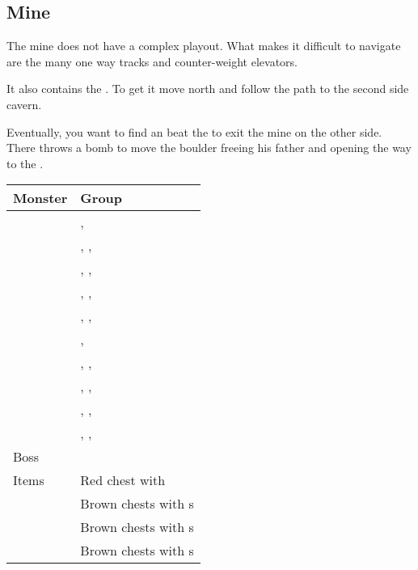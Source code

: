 \subsection{Mine}
\label{map:mine}

The mine does not have a complex playout. What makes it difficult to navigate are the many one way tracks and counter-weight elevators.

It also contains the . To get it move north and follow the path to the second side cavern.

Eventually, you want to find an beat the  to exit the mine on the other side. There  throws a bomb to move the boulder freeing his father and opening the way to the .


\noindent\begin{tabularx}{\textwidth}[l]{lX}
	Monster & Group
\\ \hline
	\nameref{monster:red_bone}
	& \nameref{monster:red_bone}, \nameref{monster:red_bone} \\
	& \nameref{monster:red_bone}, \nameref{monster:red_bone}, \nameref{monster:zombie} \\
	& \nameref{monster:red_bone}, \nameref{monster:red_bone}, \nameref{monster:red_bone}
\\ \hline
	\nameref{monster:red_cap}
	& \nameref{monster:red_cap}, \nameref{monster:red_cap}, \nameref{monster:flazzard} \\
	& \nameref{monster:red_cap}, \nameref{monster:red_cap}, \nameref{monster:red_cap}
\\ \hline
	\nameref{monster:zombie}
	& \nameref{monster:zombie}, \nameref{monster:zombie} \\
	& \nameref{monster:zombie}, \nameref{monster:zombie}, \nameref{monster:red_cap} \\
	& \nameref{monster:zombie}, \nameref{monster:zombie}, \nameref{monster:zombie}
\\ \hline
	\nameref{monster:flazzard}
	& \nameref{monster:flazzard}, \nameref{monster:flazzard}, \nameref{monster:plant_man} \\
	& \nameref{monster:flazzard}, \nameref{monster:flazzard}, \nameref{monster:flazzard}
\\ \hline
	Boss & \nameref{monster:jinn}
\\ \hline
	Items
	& Red chest with \nameref{weapon:charm_claw} \\
	& Brown chests with \nameref{weapon:bomb}s \\
	& Brown chests with \nameref{item:cure_potion}s \\
	& Brown chests with \nameref{item:heal_potion}s
\end{tabularx}

